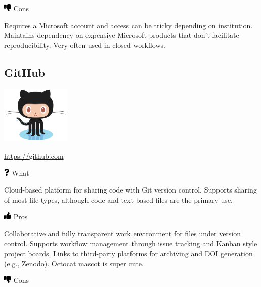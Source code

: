 \documentclass[
  letterpaper,
  DIV=11,
  numbers=noendperiod]{scrreprt}
\begin{document}
\includegraphics[width=1em,height=1em]{./collaborate_files/figure-pdf/fa-icon-c9ddf618df48250f2c0ed0cb59d4f20d.pdf}
Cons

Requires a Microsoft account and access can be tricky depending on
institution. Maintains dependency on expensive Microsoft products that
don't facilitate reproducibility. Very often used in closed workflows.

\hypertarget{github}{%
\subsection{GitHub}\label{github}}

\includegraphics[width=0.25\textwidth,height=\textheight]{./img/Octocat.png}

\url{https://github.com}

\includegraphics[width=0.75em,height=1em]{./collaborate_files/figure-pdf/fa-icon-8447cf12acba1bc263badfefa79f6dd7.pdf}
What

Cloud-based platform for sharing code with Git version control. Supports
sharing of most file types, although code and text-based files are the
primary use.

\includegraphics[width=1em,height=1em]{./collaborate_files/figure-pdf/fa-icon-e4ee65476be467d7be8a1ae9cb02ffda.pdf}
Pros

Collaborative and fully transparent work environment for files under
version control. Supports workflow management through issue tracking and
Kanban style project boards. Links to third-party platforms for
archiving and DOI generation (e.g., \href{https://zenodo.org/}{Zenodo}).
Octocat mascot is super cute.

\includegraphics[width=1em,height=1em]{./collaborate_files/figure-pdf/fa-icon-c9ddf618df48250f2c0ed0cb59d4f20d.pdf}
Cons
\end{document}
